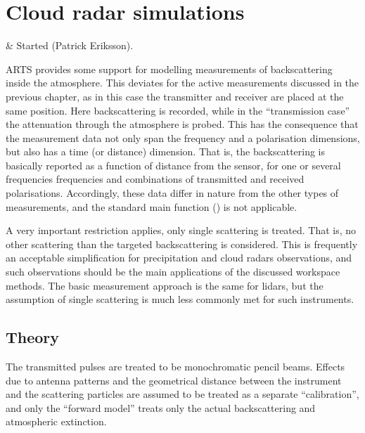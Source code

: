 \chapter{Cloud radar simulations}
 \label{sec:cradar}


 & Started (Patrick Eriksson).\\
\stophistory

ARTS provides some support for modelling measurements of backscattering inside
the atmosphere. This deviates for the active measurements discussed in the
previous chapter, as in this case the transmitter and receiver are placed at the
same position. Here backscattering is recorded, while in the ``transmission
case'' the attenuation through the atmosphere is probed. This has the
consequence that the measurement data not only span the frequency and a
polarisation dimensions, but also has a time (or distance) dimension. That is,
the backscattering is basically reported as a function of distance from the
sensor, for one or several frequencies frequencies and combinations of
transmitted and received polarisations. Accordingly, these data differ in
nature from the other types of measurements, and the standard main function 
() is not applicable.

A very important restriction applies, only single scattering is treated. That
is, no other scattering than the targeted backscattering is considered. This is
frequently an acceptable simplification for precipitation and cloud radars
observations, and such observations should be the main applications of the
discussed workspace methods. The basic measurement approach is the same for
lidars, but the assumption of single scattering is much less commonly met for
such instruments.


\section{Theory}
\label{sec:cradar:theory}

The transmitted pulses are treated to be monochromatic pencil beams. Effects
due to antenna patterns and the geometrical distance between the instrument and
the scattering particles are assumed to be treated as a separate
``calibration'', and only the ``forward model'' treats only the actual
backscattering and atmospheric extinction. 

